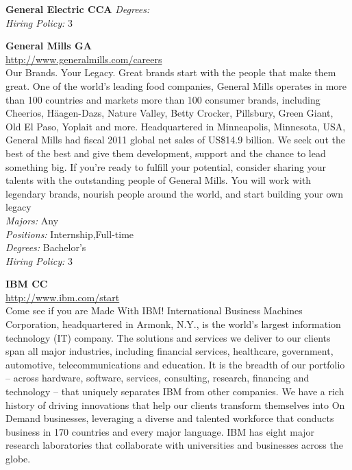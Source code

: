 \documentclass[twoside]{article}
\begin{document}
\begin{center}
\begin{multicols}{2}
\begin{minipage}{.95\columnwidth}{\Large\bf General Electric \hfill CCA}
    \emph{Degrees:} \\
    \emph{Hiring Policy:} 3\\
\end{minipage}
 \begin{minipage}{.95\columnwidth}{\Large\bf General Mills \hfill GA}\\
    \url{http://www.generalmills.com/careers}\\
    Our Brands. Your Legacy. Great brands start with the people that make them great. One of the world's leading food companies, General Mills operates in more than 100 countries and markets more than 100 consumer brands, including Cheerios, Häagen-Dazs, Nature Valley, Betty Crocker, Pillsbury, Green Giant, Old El Paso, Yoplait and more. Headquartered in Minneapolis, Minnesota, USA, General Mills had fiscal 2011 global net sales of US\$14.9 billion. We seek out the best of the best and give them development, support and the chance to lead something big. If you’re ready to fulfill your potential, consider sharing your talents with the outstanding people of General Mills. You will work with legendary brands, nourish people around the world, and start building your own legacy\\
    \emph{Majors:} Any\\
    \emph{Positions:} Internship,Full-time\\
    \emph{Degrees:} Bachelor's\\
    \emph{Hiring Policy:} 3\\
\end{minipage}
 \begin{minipage}{.95\columnwidth}{\Large\bf IBM \hfill CC}\\
    \url{http://www.ibm.com/start}\\
    Come see if you are Made With IBM! International Business Machines Corporation, headquartered in Armonk, N.Y., is the world's largest information technology (IT) company. The solutions and services we deliver to our clients span all major industries, including financial services, healthcare, government, automotive, telecommunications and education. It is the breadth of our portfolio -- across hardware, software, services, consulting, research, financing and technology -- that uniquely separates IBM from other companies. We have a rich history of driving innovations that help our clients transform themselves into On Demand businesses, leveraging a diverse and talented workforce that conducts business in 170 countries and every major language. IBM has eight major research laboratories that collaborate with universities and businesses across the globe.\\

\end{minipage}
\end{multicols}
\end{center}
\end{document}
